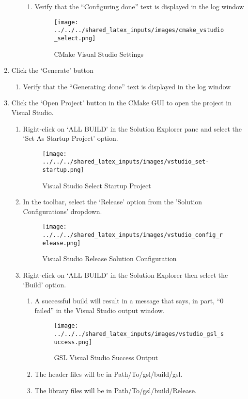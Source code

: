 \begin{enumerate}
\begin{enumerate}
		\begin{enumerate}
			\item Verify that the “Configuring done” text is displayed in the log window
			\begin{figure}[H]
				\centering
				\texttt{[image: ../../../shared\_latex\_inputs/images/cmake\_vstudio\_select.png]}
				\caption{CMake Visual Studio Settings}
			\end{figure}
		\end{enumerate}
	\end{enumerate}	
	\item Click the ‘Generate’ button
	\begin{enumerate}
		\item Verify that the “Generating done” text is displayed in the log window
	\end{enumerate}	
	\item Click the ‘Open Project’ button in the CMake GUI to open the project in Visual Studio.
	\begin{enumerate}
		\item Right-click on ‘ALL BUILD’ in the Solution Explorer pane and select the ‘Set As Startup Project’ option. 
			\begin{figure}[H]
				\centering
				\texttt{[image: ../../../shared\_latex\_inputs/images/vstudio\_set-startup.png]}
				\caption{Visual Studio Select Startup Project}
			\end{figure}
		\item In the toolbar, select the ‘Release’ option from the 'Solution Configurations' dropdown.
			\begin{figure}[H]
				\centering
				\texttt{[image: ../../../shared\_latex\_inputs/images/vstudio\_config\_release.png]}
				\caption{Visual Studio Release Solution Configuration}
			\end{figure}
		\item Right-click on ‘ALL BUILD’ in the Solution Explorer then select the ‘Build’ option.
		\begin{enumerate}
			\item A successful build will result in a message that says, in part, “0 failed” in the Visual Studio output window. 
			\begin{figure}[H]
				\centering
				\texttt{[image: ../../../shared\_latex\_inputs/images/vstudio\_gsl\_success.png]}
				\caption{GSL Visual Studio Success Output}
			\end{figure}
			\item The header files will be in Path/To/gsl/build/gsl.
			\item The library files will be in Path/To/gsl/build/Release.
		\end{enumerate}
	\end{enumerate}		
\end{enumerate}
